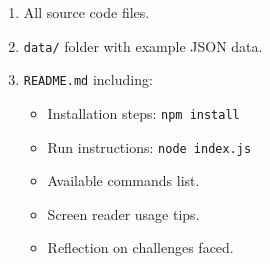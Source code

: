 \documentclass[
  justified,
  openright,
]{tufte-book}
\providecommand{\tightlist}{%
  \setlength{\itemsep}{0pt}\setlength{\parskip}{0pt}}
\begin{document}
\begin{enumerate}
\def\labelenumi{\arabic{enumi}.}
\tightlist
\item
  All source code files.
\item
  \texttt{data/} folder with example JSON data.
\item
  \texttt{README.md} including:

  \begin{itemize}
  \tightlist
  \item
    Installation steps: \texttt{npm\ install}
  \item
    Run instructions: \texttt{node\ index.js}
  \item
    Available commands list.
  \item
    Screen reader usage tips.
  \item
    Reflection on challenges faced.
  \end{itemize}
\end{enumerate}
\end{document}
